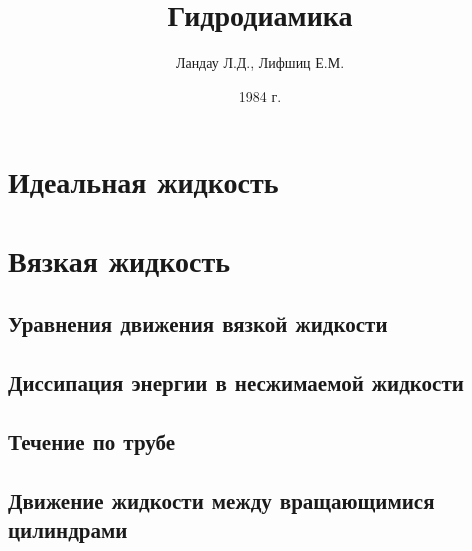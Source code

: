 \documentclass[12pt,a4paper]{book}
\title{Гидродиамика}
\author{Ландау Л.Д., Лифшиц Е.М.}
\date{1984 г.}
\begin{document}
\maketitle %
\frontmatter
\tableofcontents %
\mainmatter

\pagestyle{fancy}
\chapter{Идеальная жидкость}

\chapter{Вязкая жидкость}
\section{Уравнения движения вязкой жидкости}\label{sec:p15}
\section{Диссипация энергии в несжимаемой жидкости}\label{sec:p16}
\section{Течение по трубе}\label{sec:p17}
\section{Движение жидкости между вращающимися цилиндрами}\label{sec:p18}
\end{document}

